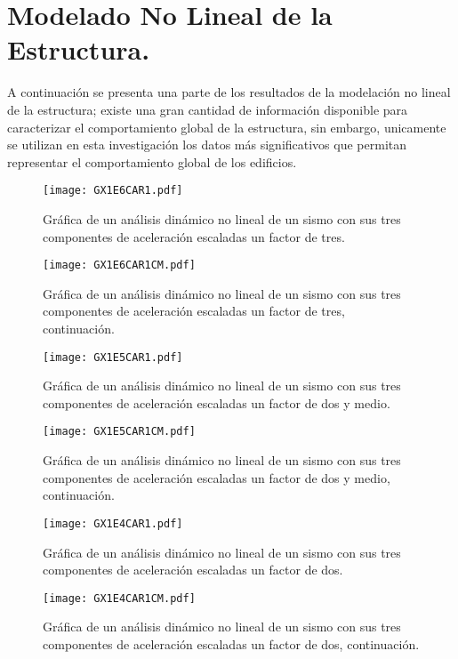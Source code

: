 \newpage

\section{Modelado No Lineal de la Estructura.}

A continuaci\'on se presenta una parte de los resultados de la modelaci\'on no lineal de la estructura; existe una gran cantidad de informaci\'on disponible para caracterizar el comportamiento global de la estructura, sin embargo, unicamente se utilizan en esta investigaci\'on los datos m\'as significativos que permitan representar el comportamiento global de los edificios.

\begin{figure} [htbp]
\texttt{[image: GX1E6CAR1.pdf]}
\caption{Gr\'afica de un an\'alisis din\'amico no lineal de un sismo con sus tres componentes de aceleraci\'on escaladas un factor de tres.}
\label{fig:rfadnl1a}
\end{figure}

\begin{figure} [htbp]
\texttt{[image: GX1E6CAR1CM.pdf]}
\caption{Gr\'afica de un an\'alisis din\'amico no lineal de un sismo con sus tres componentes de aceleraci\'on escaladas un factor de tres, continuaci\'on.}
\label{fig:rfadnl1b}
\end{figure}

\begin{figure} [htbp]
\texttt{[image: GX1E5CAR1.pdf]}
\caption{Gr\'afica de un an\'alisis din\'amico no lineal de un sismo con sus tres componentes de aceleraci\'on escaladas un factor de dos y medio.}
\label{fig:rfadnl2a}
\end{figure}

\begin{figure} [htbp]
\texttt{[image: GX1E5CAR1CM.pdf]}
\caption{Gr\'afica de un an\'alisis din\'amico no lineal de un sismo con sus tres componentes de aceleraci\'on escaladas un factor de dos y medio, continuaci\'on.}
\label{fig:rfadnl2b}
\end{figure}

\begin{figure} [htbp]
\texttt{[image: GX1E4CAR1.pdf]}
\caption{Gr\'afica de un an\'alisis din\'amico no lineal de un sismo con sus tres componentes de aceleraci\'on escaladas un factor de dos.}
\label{fig:rfadnl3a}
\end{figure}

\begin{figure} [htbp]
\texttt{[image: GX1E4CAR1CM.pdf]}
\caption{Gr\'afica de un an\'alisis din\'amico no lineal de un sismo con sus tres componentes de aceleraci\'on escaladas un factor de dos, continuaci\'on.}
\label{fig:rfadnl3b}
\end{figure}

